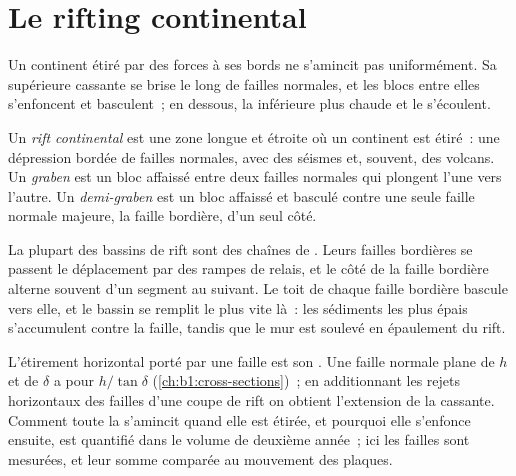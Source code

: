 \section{Le rifting continental}

Un continent étiré par des forces à ses bords ne s'amincit pas uniformément. Sa 
supérieure cassante se brise le long de failles normales, et les blocs entre elles s'enfoncent
et basculent~; en dessous, la  inférieure plus chaude et le  s'écoulent.

\begin{definition}\label{def:b1:rifts-ridges-margins:rift}
Un \emph{rift continental} est une zone longue et étroite où
un continent est étiré~: une dépression bordée de failles normales, avec
des séismes et, souvent, des volcans. Un \emph{graben} est un bloc
affaissé entre deux failles normales qui plongent l'une vers l'autre. Un
\emph{demi-graben} est un bloc affaissé et basculé contre une
seule faille normale majeure, la faille bordière, d'un seul côté.
\end{definition}

La plupart des bassins de rift sont des chaînes de . Leurs failles bordières se
passent le déplacement par des rampes de relais, et le côté de la
faille bordière alterne souvent d'un segment au suivant. Le toit
de chaque faille bordière bascule vers elle, et le bassin se remplit le plus vite là~:
les sédiments les plus épais s'accumulent contre la faille, tandis que le mur est soulevé
en épaulement du rift.

L'étirement horizontal porté par une faille est son . Une faille normale
plane de  $h$ et de  $\delta$ a pour  $h/\tan\delta$
(\cref{ch:b1:cross-sections})~; en additionnant les rejets horizontaux des failles d'une
coupe de rift on obtient l'extension de la  cassante. Comment toute la 
s'amincit quand elle est étirée, et pourquoi elle s'enfonce ensuite, est quantifié dans le volume
de deuxième année~; ici les failles sont mesurées, et leur somme comparée au mouvement
des plaques.

